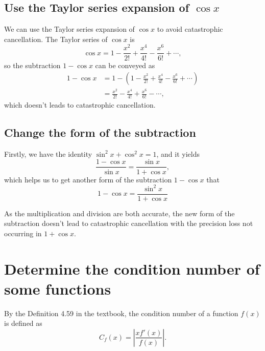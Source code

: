 \documentclass[a4paper]{article}
\begin{document}
\subsection{Use the Taylor series expansion of $\cos x$}

We can use the Taylor series expansion of $\cos x$ to avoid catastrophic cancellation. The Taylor series of $\cos x$ is
\begin{equation}
    \cos x = 1 - \frac{x^2}{2!} + \frac{x^4}{4!} - \frac{x^6}{6!} + \cdots,
    \label{eq:7_taylor_cos}
\end{equation}
so the subtraction $1 - \cos x$ can be conveyed as 
\begin{equation}
    \begin{aligned}
        1 - \cos x &= 1 - (1 - \frac{x^2}{2!} + \frac{x^4}{4!} - \frac{x^6}{6!} + \cdots) \\
        &= \frac{x^2}{2!} - \frac{x^4}{4!} + \frac{x^6}{6!} - \cdots,
    \end{aligned}
    \label{eq:7_taylor_subtraction}
\end{equation}
which doesn't leads to catastrophic cancellation.

\subsection{Change the form of the subtraction}

Firstly, we have the identity $\sin^2 x + \cos^2 x = 1$, and it yields
\begin{equation}
    \frac{1 - \cos x}{\sin x} = \frac{\sin x}{1 + \cos x},
    \label{eq:7_sin_cos}
\end{equation}
which helps us to get another form of the subtraction $1 - \cos x$ that 
\begin{equation}
    1 - \cos x = \frac{\sin^2 x}{1 + \cos x}
    \label{eq:7_sin_cos_subtraction}
\end{equation}

As the multiplication and division are both accurate, the new form of the subtraction doesn't lead to catastrophic cancellation with the precision loss not occurring in $1 + \cos x$.

\section{Determine the condition number of some functions}

By the Definition 4.59 in the textbook, the condition number of a function $f(x)$ is defined as
\begin{equation}
    C_f(x) = \left|\frac{xf'(x)}{f(x)}\right|.
    \label{eq:8_condition_number_definition}
\end{equation}
\end{document}
